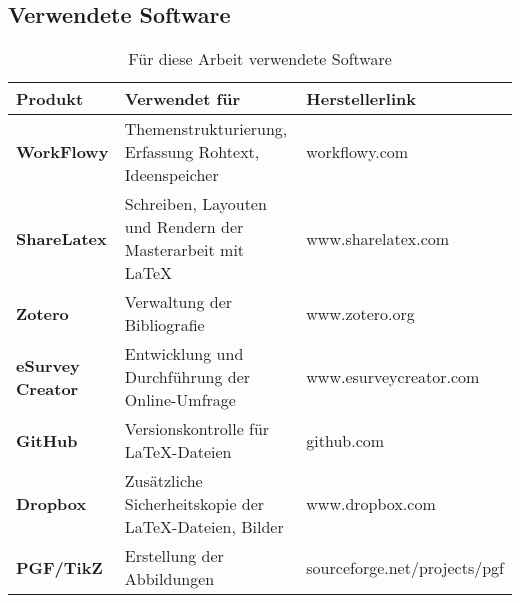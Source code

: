 \documentclass[main.tex]{subfiles}
\begin{document}
\subsection*{Verwendete Software}


\begin{table}[H]
\caption{Für diese Arbeit verwendete Software}
\label{used-sw}


\begin{tabular}{ |p{3cm}|p{8cm}|l| }


\hline
\rowcolor[HTML]{C0C0C0} 
\textbf{Produkt} & \textbf{Verwendet für} & \textbf{Herstellerlink}\\ 
\hline


\textbf{WorkFlowy} & Themenstrukturierung, Erfassung Rohtext, Ideenspeicher & workflowy.com \\ \hline
\textbf{ShareLatex} & Schreiben, Layouten und Rendern der Masterarbeit mit \LaTeX & www.sharelatex.com \\ \hline
\textbf{Zotero} & Verwaltung der Bibliografie & www.zotero.org \\ \hline
\textbf{eSurvey Creator} & Entwicklung und Durchführung der Online-Umfrage & www.esurveycreator.com \\ \hline
\textbf{GitHub} & Versionskontrolle für \LaTeX  -Dateien & github.com \\ \hline
\textbf{Dropbox} & Zusätzliche Sicherheitskopie der \LaTeX  -Dateien, Bilder & www.dropbox.com \\ \hline
\textbf{PGF/TikZ} & Erstellung der Abbildungen & sourceforge.net/projects/pgf \\ \hline

\end{tabular}
\end{table}
\end{document}
